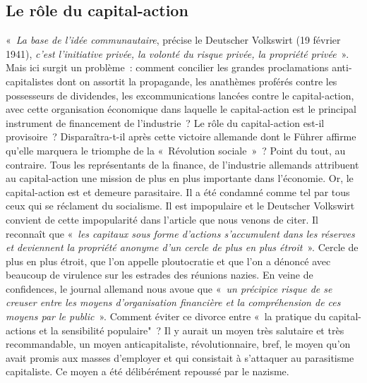 \documentclass[french,twoside]{book} %
\begin{document}
\subsection[Le rôle du capital-action]{Le rôle du capital-action}
\noindent « \emph{La base de l’idée communautaire}, précise le Deutscher Volkswirt (19 février 1941), \emph{c’est l’initiative privée, la volonté du risque privée, la propriété privée} ». Mais ici surgit un problème : comment concilier les grandes proclamations anti-capitalistes dont on assortit la propagande, les anathèmes proférés contre les possesseurs de dividendes, les excommunications lancées contre le capital-action, avec cette organisation économique dans laquelle le capital-action est le principal instrument de financement de l’industrie ? Le rôle du capital-action est-il provisoire ? Disparaîtra-t-il après cette victoire allemande dont le Führer affirme qu’elle marquera le triomphe de la « Révolution sociale » ? Point du tout, au contraire. Tous les représentants de la finance, de l’industrie allemands attribuent au capital-action une mission de plus en plus importante dans l’économie. Or, le capital-action est et demeure parasitaire. Il a été condamné comme tel par tous ceux qui se réclament du socialisme. Il est impopulaire et le Deutscher Volkswirt convient de cette impopularité dans l’article que nous venons de citer. Il reconnaît que « \emph{les capitaux sous forme d’actions s’accumulent dans les réserves et deviennent la propriété anonyme d’un cercle de plus en plus étroit} ». Cercle de plus en plus étroit, que l’on appelle ploutocratie et que l’on a dénoncé avec beaucoup de virulence sur les estrades des réunions nazies. En veine de confidences, le journal allemand nous avoue que « \emph{un précipice risque de se creuser entre les moyens d’organisation financière et la compréhension de ces moyens par le public} ». Comment éviter ce divorce entre « la pratique du capital-actions et la sensibilité populaire" ? Il y aurait un moyen très salutaire et très recommandable, un moyen anticapitaliste, révolutionnaire, bref, le moyen qu’on avait promis aux masses d’employer et qui consistait à s’attaquer au parasitisme capitaliste. Ce moyen a été délibérément repoussé par le nazisme.
\end{document}
